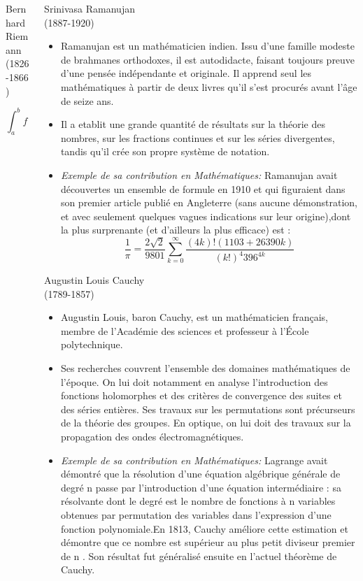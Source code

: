 \documentclass{beamer}
\begin{document}
\begin{frame}[fragile]
\begin{columns}[T]
\begin{column}{.50\textwidth}
\begin{block}{Bernhard Riemann\\(1826-1866)}
\begin{itemize}
\[
\int_a^b f(x) \, dx = \lim_{\| P \| \to 0} \sum_{i=1}^{n} f(x_i^*) \Delta x_i
\]
    \end{itemize}
   \end{block} 
 \end{column}
 \begin{column}{.50\textwidth}
   \begin{block}{Srinivasa Ramanujan \\ (1887-1920)}
      \begin{itemize}
       \item Ramanujan est un mathématicien indien. Issu d'une famille modeste de brahmanes orthodoxes, il est autodidacte, faisant toujours preuve d'une pensée indépendante et originale. Il apprend seul les mathématiques à partir de deux livres qu'il s'est procurés avant l'âge de seize ans.
       \item Il a etablit une grande quantité de résultats sur la théorie des nombres, sur les fractions continues et sur les séries divergentes, tandis qu'il crée son propre système de notation.
       \item \textit{Exemple de sa contribution en Mathématiques:} Ramanujan avait découvertes un ensemble de formule en 1910 et qui figuraient dans son premier article publié en Angleterre (sans aucune démonstration, et avec seulement quelques vagues indications sur leur origine),dont la plus surprenante (et d'ailleurs la plus efficace) est : 
 \[
   \frac{1}{\pi} = \frac{2\sqrt{2}}{9801} \sum_{k=0}^{\infty} \frac{(4k)! (1103+ 26390k)}{(k!)^4 396^{4k}}
 \]  
      \end{itemize}
     \end{block}
     \begin{block}{Augustin Louis Cauchy \\ (1789-1857)}
       \begin{itemize}
        \item Augustin Louis, baron Cauchy, est un mathématicien français, membre de l’Académie des sciences et professeur à l’École polytechnique.
        \item Ses recherches couvrent l’ensemble des domaines mathématiques de l’époque. On lui doit notamment en analyse l’introduction des fonctions holomorphes et des critères de convergence des suites et des séries entières. Ses travaux sur les permutations sont précurseurs de la théorie des groupes. En optique, on lui doit des travaux sur la propagation des ondes électromagnétiques.
        \item \textit{Exemple de sa contribution en Mathématiques:} Lagrange avait démontré que la résolution d’une équation algébrique générale de degré n passe par l’introduction d’une équation intermédiaire : sa résolvante dont le degré est le nombre de fonctions à n  variables obtenues par permutation des variables dans l’expression d’une fonction polynomiale.En 1813, Cauchy améliore cette estimation et démontre que ce nombre est supérieur au plus petit diviseur premier de n . Son résultat fut généralisé ensuite en l’actuel théorème de Cauchy.  

\end{itemize}
\end{block}
\end{column}
\end{columns}
\end{frame}
\end{document}
